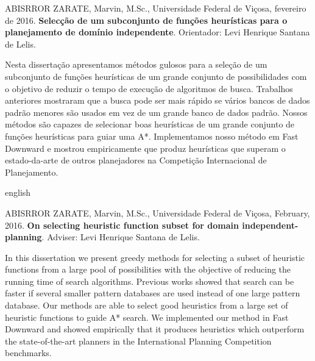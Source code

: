 \documentclass[
	12pt,				%
	openright,		%
	oneside,			%
	a4paper,			%
	english,			%
	french,				%
	spanish,			%
	brazil				%
	]{abntex2}
\begin{document}

\setlength{\absparsep}{18pt} %
\begin{resumo}[RESUMO]


{
ABISRROR ZARATE, Marvin, M.Sc., \vspace{-1.0ex}Universidade Federal de Viçosa, fevereiro de 2016. \textbf{Selecção de um subconjunto de funções heurísticas\vspace{-1.0ex} para o planejamento de domínio independente}. Orientador: Levi Henrique Santana de Lelis.
}

{
Nesta dissertação apresentamos métodos gulosos para a seleção de um subconjunto de funções heurísticas de um grande conjunto de possibilidades com o objetivo de reduzir o tempo de execução de algoritmos de busca. Trabalhos anteriores mostraram que a busca pode ser mais rápido se vários bancos de dados padrão menores são usados em vez de um grande banco de dados padrão. Nossos métodos são capazes de selecionar boas heurísticas de um grande conjunto de funções heurísticas para guiar uma A*. Implementamos nosso método em Fast Downward e mostrou empiricamente que produz heurísticas que superam o estado-da-arte de outros planejadores na Competição Internacional de Planejamento.
}
\end{resumo}

\begin{resumo}[ABSTRACT]
 \begin{otherlanguage*}{english}

{
ABISRROR ZARATE, Marvin, M.Sc., \vspace{-1.0ex}Universidade Federal de Viçosa, February, 2016. \textbf{On selecting heuristic\vspace{-1.0ex} function subset for domain independent-planning}. Adviser: Levi Henrique Santana de Lelis.
}

In this dissertation we present greedy methods for selecting a subset of heuristic functions from a large pool of possibilities with the objective of reducing the running time of search algorithms. Previous works showed that search can be faster if several smaller pattern databases are used instead of one large pattern database. Our methods are able to select good heuristics from a large set of heuristic functions to guide A* search. We implemented our method in Fast Downward and showed empirically that it produces heuristics which outperform the state-of-the-art planners in the International Planning Competition benchmarks.
 \end{otherlanguage*}
\end{resumo}
\end{document}
